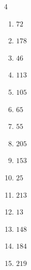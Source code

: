 \begin{multicols}{4}
\begin{enumerate}

  \item $72$


  \item $178$


  \item $46$


\columnbreak %

\resetques

  \item $113$


  \item $105$


  \item $65$


  \item $55$


  \item $205$


  \item $153$


  \item $25$


  \item $213$


  \item $13$


  \item $148$


  \item $184$


  \item $219$


\end{enumerate}
\end{multicols}

